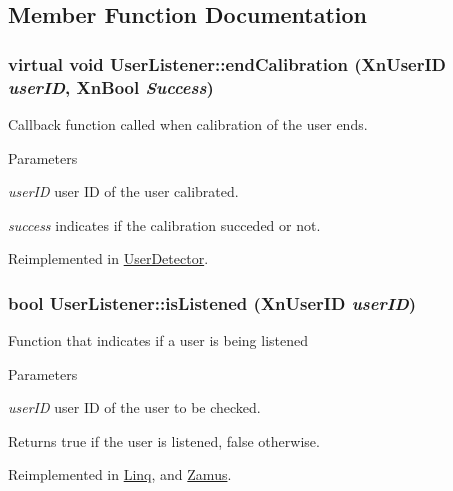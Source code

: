 \subsection{Member Function Documentation}
\hypertarget{classUserListener_a76796b86efc4cc8fc1fc250149092c1e}{
\subsubsection[{endCalibration}]{\setlength{\rightskip}{0pt plus 5cm}virtual void UserListener::endCalibration (XnUserID {\em userID}, \/  XnBool {\em Success})}}
\label{classUserListener_a76796b86efc4cc8fc1fc250149092c1e}
Callback function called when calibration of the user ends. 
\begin{DoxyParams}{Parameters}
\item[{\em userID}]user ID of the user calibrated. \item[{\em success}]indicates if the calibration succeded or not. \end{DoxyParams}


Reimplemented in \hyperlink{classUserDetector_a89a1b34569957c5cd4001c72561b554c}{UserDetector}.

\hypertarget{classUserListener_aea80d4da192afaf0329cf92e4489fd0a}{
\subsubsection[{isListened}]{\setlength{\rightskip}{0pt plus 5cm}bool UserListener::isListened (XnUserID {\em userID})}}
\label{classUserListener_aea80d4da192afaf0329cf92e4489fd0a}
Function that indicates if a user is being listened 
\begin{DoxyParams}{Parameters}
\item[{\em userID}]user ID of the user to be checked. \end{DoxyParams}
\begin{DoxyReturn}{Returns}
true if the user is listened, false otherwise. 
\end{DoxyReturn}


Reimplemented in \hyperlink{classLinq_a55070b91120aa07225d64f8bd3136c11}{Linq}, and \hyperlink{classZamus_ab76c23d1189599fd0cbbce9352b4faeb}{Zamus}.

